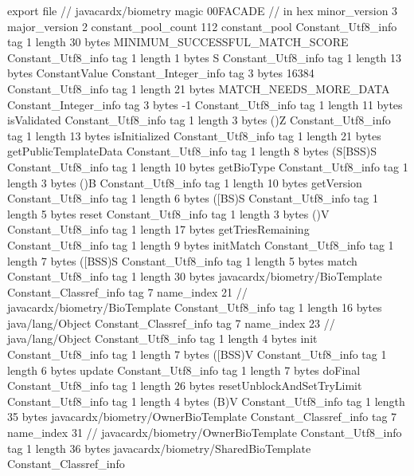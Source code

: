 export file {		// javacardx/biometry
	magic	00FACADE		 // in hex
	minor_version	3
	major_version	2
	constant_pool_count	112
	constant_pool {
		Constant_Utf8_info {
			tag	1
			length	30
			bytes	MINIMUM_SUCCESSFUL_MATCH_SCORE
		}
		Constant_Utf8_info {
			tag	1
			length	1
			bytes	S
		}
		Constant_Utf8_info {
			tag	1
			length	13
			bytes	ConstantValue
		}
		Constant_Integer_info {
			tag	3
			bytes	16384
		}
		Constant_Utf8_info {
			tag	1
			length	21
			bytes	MATCH_NEEDS_MORE_DATA
		}
		Constant_Integer_info {
			tag	3
			bytes	-1
		}
		Constant_Utf8_info {
			tag	1
			length	11
			bytes	isValidated
		}
		Constant_Utf8_info {
			tag	1
			length	3
			bytes	()Z
		}
		Constant_Utf8_info {
			tag	1
			length	13
			bytes	isInitialized
		}
		Constant_Utf8_info {
			tag	1
			length	21
			bytes	getPublicTemplateData
		}
		Constant_Utf8_info {
			tag	1
			length	8
			bytes	(S[BSS)S
		}
		Constant_Utf8_info {
			tag	1
			length	10
			bytes	getBioType
		}
		Constant_Utf8_info {
			tag	1
			length	3
			bytes	()B
		}
		Constant_Utf8_info {
			tag	1
			length	10
			bytes	getVersion
		}
		Constant_Utf8_info {
			tag	1
			length	6
			bytes	([BS)S
		}
		Constant_Utf8_info {
			tag	1
			length	5
			bytes	reset
		}
		Constant_Utf8_info {
			tag	1
			length	3
			bytes	()V
		}
		Constant_Utf8_info {
			tag	1
			length	17
			bytes	getTriesRemaining
		}
		Constant_Utf8_info {
			tag	1
			length	9
			bytes	initMatch
		}
		Constant_Utf8_info {
			tag	1
			length	7
			bytes	([BSS)S
		}
		Constant_Utf8_info {
			tag	1
			length	5
			bytes	match
		}
		Constant_Utf8_info {
			tag	1
			length	30
			bytes	javacardx/biometry/BioTemplate
		}
		Constant_Classref_info {
			tag	7
			name_index	21		// javacardx/biometry/BioTemplate
		}
		Constant_Utf8_info {
			tag	1
			length	16
			bytes	java/lang/Object
		}
		Constant_Classref_info {
			tag	7
			name_index	23		// java/lang/Object
		}
		Constant_Utf8_info {
			tag	1
			length	4
			bytes	init
		}
		Constant_Utf8_info {
			tag	1
			length	7
			bytes	([BSS)V
		}
		Constant_Utf8_info {
			tag	1
			length	6
			bytes	update
		}
		Constant_Utf8_info {
			tag	1
			length	7
			bytes	doFinal
		}
		Constant_Utf8_info {
			tag	1
			length	26
			bytes	resetUnblockAndSetTryLimit
		}
		Constant_Utf8_info {
			tag	1
			length	4
			bytes	(B)V
		}
		Constant_Utf8_info {
			tag	1
			length	35
			bytes	javacardx/biometry/OwnerBioTemplate
		}
		Constant_Classref_info {
			tag	7
			name_index	31		// javacardx/biometry/OwnerBioTemplate
		}
		Constant_Utf8_info {
			tag	1
			length	36
			bytes	javacardx/biometry/SharedBioTemplate
		}
		Constant_Classref_info {
}}}
